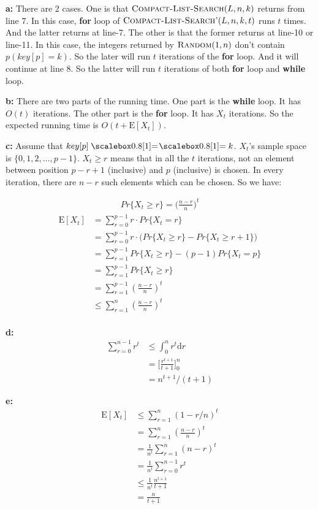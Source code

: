 \documentclass{book}
\begin{document}
\begin{CJK}{UTF8}{gkai}
\textbf{a:}
There are 2 cases. One is that $\textnormal{\scshape Compact-List-Search}(L,n,k)$ returns from 
line 7. In this case, \textbf{for} loop of 
$\textnormal{\scshape Compact-List-Search'}(L,n,k,t)$ runs $t$ times. And the latter returns at 
line-7. The other is that the former returns at line-10 or line-11. In this 
case, the integers returned by $\textnormal{\scshape Random}(1,n)$ don't contain $p(key[p]=k)$.  
So the later will run $t$ iterations of the \textbf{for} loop. And it will 
continue at line 8. So the latter will run $t$ iterations of both \textbf{for} 
loop and \textbf{while} loop.

\textbf{b:}
There are two parts of the running time. One part is the \textbf{while} loop. It 
has $O(t)$ iterations. The other part is the \textbf{for} loop. It has $X_t$ 
iterations. So the expected running time is $O(t+\text{E}[X_t])$.

\textbf{c:}
Assume that $key[p] \isequal k$. $X_t$'s sample space is $\{0, 1, 2, \dots, 
p-1\}$. $X_t \ge r$ means that in all the $t$ iterations, not an element between 
position $p-r+1$ (inclusive) and $p$ (inclusive) is chosen. In every iteration, 
there are $n-r$ such elements which can be chosen. So we have:

\begin{align*}
Pr\{X_t\ge r\} = \big(\frac{n-r}{n}\big)^t
\end{align*}
\begin{align*}
\text{E}[X_t] & = \sum_{r=0}^{p-1}r\cdot Pr\{X_t = r\} \\
& = \sum_{r=0}^{p-1}r\cdot\Big(Pr\{X_t \ge r\}-Pr\{X_t \ge r+1\}\Big) \\
& = \sum_{r=1}^{p-1}Pr\{X_t \ge r\} - (p-1)Pr\{X_t = p\} \\
& = \sum_{r=1}^{p-1}Pr\{X_t \ge r\} \\
& = \sum_{r=1}^{p-1}(\frac{n-r}{n})^t \\
& \le \sum_{r=1}^{n}(\frac{n-r}{n})^t \\
\end{align*}

\textbf{d:}
\begin{align*}
\sum_{r=0}^{n-1}r^t & \le \int_{0}^{n} r^t {\mathrm{d}r} \\
& = \Big[\frac{r^{t+1}}{t+1}\Big]_0^n \\
& = n^{t+1}/(t+1)
\end{align*}

\textbf{e:}
\begin{align*}
\text{E}[X_t] & \le \sum_{r=1}^{n}(1-r/n)^t \\
& = \sum_{r=1}^{n}(\frac{n-r}{n})^t \\
& = \frac{1}{n^t}\sum_{r=1}^{n}(n-r)^t \\
& = \frac{1}{n^t}\sum_{r=0}^{n-1}r^t \\
& \le \frac{1}{n^t}\frac{n^{t+1}}{t+1} \\
& = \frac{n}{t+1}
\end{align*}


\end{CJK}
\end{document}
